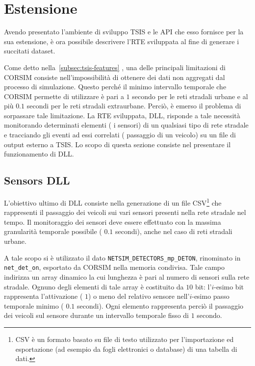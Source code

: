 \vspace*{8pt}

\cleardoublepage
\section{Estensione}\label{sec:sensors-rte}
Avendo presentato l'ambiente di sviluppo \acs{TSIS} e le \acs{API} che esso fornisce per la sua estensione, è ora possibile descrivere l'\acl{RTE} sviluppata al fine di generare i succitati dataset.

Come detto nella~\autoref{subsec:tsis-features} , una delle principali limitazioni di \acs{CORSIM} consiste nell'impossibilità di ottenere dei dati non aggregati dal processo di simulazione. Questo perché il minimo intervallo temporale che \acs{CORSIM} permette di utilizzare è pari a $1$ secondo per le reti stradali urbane e al più $0.1$ secondi per le reti stradali extraurbane. Perciò, è emerso il problema di sorpassare tale limitazione. La \acs{RTE} sviluppata,  \acs{DLL}, risponde a tale necessità monitorando determinati elementi (\ie{} i sensori) di un qualsiasi tipo di rete stradale e tracciando gli eventi ad essi correlati (\ie{} passaggio di un veicolo) su un file di output esterno a \acs{TSIS}. Lo scopo di questa sezione consiste nel presentare il funzionamento di  \acs{DLL}.

\subsection{Sensors DLL}\label{subsec:sensors-dll}
L'obiettivo ultimo di  \acs{DLL} consiste nella generazione di un file \acs{CSV}\footnote{\acf{CSV} è un formato basato su file di testo utilizzato per l'importazione ed esportazione (ad esempio da fogli elettronici o database) di una tabella di dati.} che rappresenti il passaggio dei veicoli sui vari sensori presenti nella rete stradale nel tempo. Il monitoraggio dei sensori deve essere effettuato con la massima granularità temporale possibile (\ie{} $0.1$ secondi), anche nel caso di reti stradali urbane.

A tale scopo si è utilizzato il dato \lstinline[]|NETSIM_DETECTORS_mp_DETON|, rinominato in \lstinline[]|net_det_on|, esportato da \acs{CORSIM} nella memoria condivisa. Tale campo indirizza un array dinamico la cui lunghezza è pari al numero di sensori sulla rete stradale. Ognuno degli elementi di tale array è costituito da $10$ bit: l'$i$-esimo bit rappresenta l'attivazione (\ie{} $1$) o meno del relativo sensore nell'$i$-esimo passo temporale minimo (\ie{} $0.1$ secondi). Ogni elemento rappresenta perciò il passaggio dei veicoli sul sensore durante un intervallo temporale fisso di $1$ secondo.

